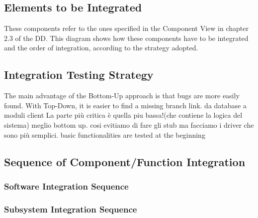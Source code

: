 \documentclass[18pt,oneside,a4paper, titlepage]{article}
\begin{document}
	\subsection{Elements to	be Integrated}
		These components refer to the ones specified in the Component View in chapter 2.3 of the DD. This diagram shows how these components have to be integrated and the order of integration, according to the strategy adopted.
	\subsection{Integration Testing Strategy}
		The main advantage of the Bottom-Up approach is that bugs are more easily found. With Top-Down, it is easier to find a missing branch link.
		da database a moduli client
		La parte più critica è quella piu bassa!(che contiene la logica del sistema) meglio bottom up.
		cosi evitiamo di fare gli stub ma facciamo i driver che sono più semplici.
		basic functionalities are tested at the beginning
	\subsection{Sequence of	Component/Function Integration}
		\subsubsection{Software	Integration	Sequence}
		\subsubsection{Subsystem Integration Sequence}
\end{document}
